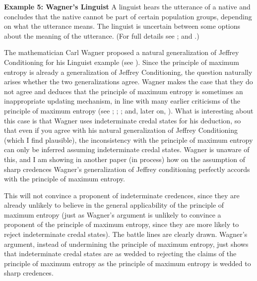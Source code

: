 \begin{quotex}
  \textbf{Example 5: Wagner's Linguist} A linguist
  hears the utterance of a native and concludes that
  the native cannot be part of certain population
  groups, depending on what the utterance means. The
  linguist is uncertain between some options about the
  meaning of the utterance. (For full details see
  ; and
  .)
\end{quotex}

The mathematician Carl Wagner proposed a natural
generalization of Jeffrey Conditioning for his Linguist
example (see ). Since the
principle of maximum entropy is already a
generalization of Jeffrey Conditioning, the question
naturally arises whether the two generalizations agree.
Wagner makes the case that they do not agree and
deduces that the principle of maximum entropy is
sometimes an inappropriate updating mechanism, in line
with many earlier criticisms of the principle of
maximum entropy (see ;
; ;
and, later on, ). What is
interesting about this case is that Wagner uses
indeterminate credal states for his deduction, so that
even if you agree with his natural generalization of
Jeffrey Conditioning (which I find plausible), the
inconsistency with the principle of maximum entropy can
only be inferred assuming indeterminate credal states.
Wagner is unaware of this, and I am showing in another
paper (in process) how on the assumption of sharp
credences Wagner's generalization of Jeffrey
conditioning perfectly accords with the principle of
maximum entropy.

This will not convince a proponent of indeterminate
credences, since they are already unlikely to believe
in the general applicability of the principle of
maximum entropy (just as Wagner's argument is unlikely
to convince a proponent of the principle of maximum
entropy, since they are more likely to reject
indeterminate credal states). The battle lines are
clearly drawn. Wagner's argument, instead of
undermining the principle of maximum entropy, just
shows that indeterminate credal states are as wedded to
rejecting the claims of the principle of maximum
entropy as the principle of maximum entropy is wedded
to sharp credences.

